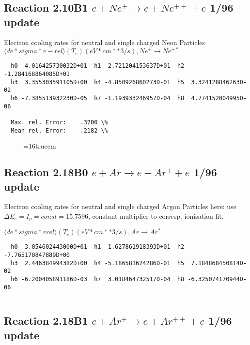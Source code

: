 \documentclass[12pt,dvipdfmx]{article}
\begin{document}
{\subsection{
Reaction 2.10B1 $ e + Ne^+ \rightarrow e + Ne^{++} + e $ 1/96 update
}

  Electron cooling rates for neutral and single
  charged Neon Particles
 $  \langle de*sigma*v-rel \rangle(T_e)  (eV*cm**3/s), Ne^+ \rightarrow Ne^{+*} $

\begin{small}\begin{verbatim}
  h0 -4.016425730032D+01  h1  2.721204153637D+01  h2 -1.284168864085D+01
  h3  3.355303591105D+00  h4 -4.850926860273D-01  h5  3.324128846263D-02
  h6 -7.385513932230D-05  h7 -1.193933246957D-04  h8  4.774152004995D-06

  Max. rel. Error:    .3700 \%
  Mean rel. Error:    .2182 \%

\end{verbatim}\end{small}

\begin{figure} \label{2.10l}
\epsfxsize=16truecm
\end{figure}
\newpage

\subsection{
Reaction 2.18B0 $e + Ar  \rightarrow e + Ar^+  + e$ 1/96 update
}

  Electron cooling rates for neutral and single
  charged Argon Particles
  here: use $\Delta E_e = I_p = const = 15.7596$,
  constant multiplier to corresp. ionisation fit.

 $ \langle de*sigma*vrel \rangle(T_e)  (eV*cm**3/s), Ar  \rightarrow Ar^* $

\begin{small}\begin{verbatim}
  h0 -3.054602443000D+01  h1  1.627861918393D+01  h2 -7.765170847889D+00
  h3  2.446384994382D+00  h4 -5.186581624286D-01  h5  7.184868450814D-02
  h6 -6.200405891186D-03  h7  3.018464732517D-04  h8 -6.325074170944D-06


\end{verbatim}\end{small}


\subsection{
Reaction 2.18B1 $e + Ar^+ \rightarrow e + Ar^{++} + e$ 1/96 update
}

}
\end{document}
